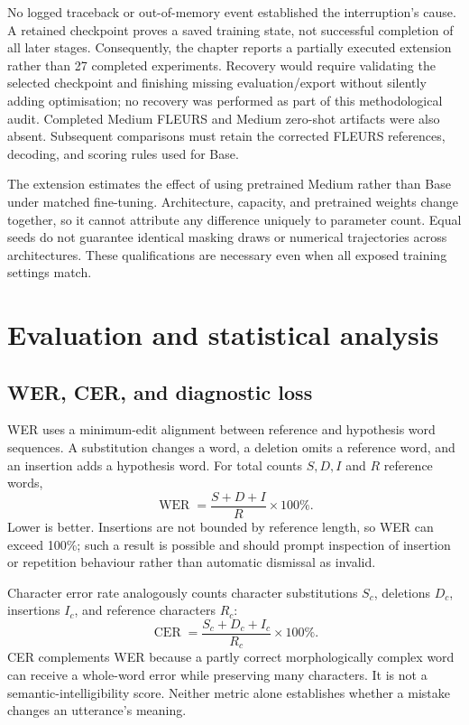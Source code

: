 \documentclass[12pt,a4paper]{report}
\begin{document}
No logged traceback or out-of-memory event established the interruption's cause. A retained checkpoint proves a saved training state, not successful completion of all later stages. Consequently, the chapter reports a partially executed extension rather than 27 completed experiments. Recovery would require validating the selected checkpoint and finishing missing evaluation/export without silently adding optimisation; no recovery was performed as part of this methodological audit. Completed Medium FLEURS and Medium zero-shot artifacts were also absent. Subsequent comparisons must retain the corrected FLEURS references, decoding, and scoring rules used for Base.

The extension estimates the effect of using pretrained Medium rather than Base under matched fine-tuning. Architecture, capacity, and pretrained weights change together, so it cannot attribute any difference uniquely to parameter count. Equal seeds do not guarantee identical masking draws or numerical trajectories across architectures. These qualifications are necessary even when all exposed training settings match.

\section{Evaluation and statistical analysis}
\label{sec:statistics}

\subsection{WER, CER, and diagnostic loss}

WER uses a minimum-edit alignment between reference and hypothesis word sequences. A substitution changes a word, a deletion omits a reference word, and an insertion adds a hypothesis word. For total counts $S,D,I$ and $R$ reference words,
\begin{equation}\operatorname{WER}=\frac{S+D+I}{R}\times100\%.\end{equation}
Lower is better. Insertions are not bounded by reference length, so WER can exceed 100\%; such a result is possible and should prompt inspection of insertion or repetition behaviour rather than automatic dismissal as invalid.

Character error rate analogously counts character substitutions $S_c$, deletions $D_c$, insertions $I_c$, and reference characters $R_c$:
\begin{equation}\operatorname{CER}=\frac{S_c+D_c+I_c}{R_c}\times100\%.\end{equation}
CER complements WER because a partly correct morphologically complex word can receive a whole-word error while preserving many characters. It is not a semantic-intelligibility score. Neither metric alone establishes whether a mistake changes an utterance's meaning.
\end{document}
